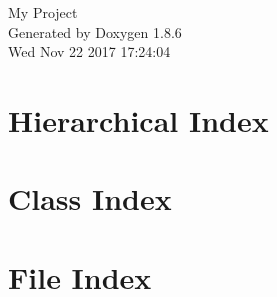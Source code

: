 \documentclass[twoside]{book}
\newcommand{\clearemptydoublepage}{%
  \newpage{\pagestyle{empty}\cleardoublepage}%
}
\begin{document}
\hypersetup{pageanchor=false}
\begin{titlepage}
\vspace*{7cm}
\begin{center}%
{\Large My Project }\\
\vspace*{1cm}
{\large Generated by Doxygen 1.8.6}\\
\vspace*{0.5cm}
{\small Wed Nov 22 2017 17:24:04}\\
\end{center}
\end{titlepage}
\clearemptydoublepage
\tableofcontents
\clearemptydoublepage
{}
\hypersetup{pageanchor=true}

\chapter{Hierarchical Index}

\chapter{Class Index}

\chapter{File Index}

\end{document}
